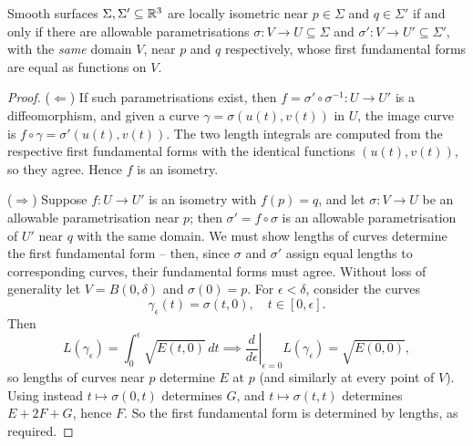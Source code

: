 \documentclass[a4paper]{scrartcl}
\begin{document}
\begin{lemma}\label{lem:fffisometry}
    Smooth surfaces $\Sigma, \Sigma' \subseteq \mathbb{R}^3$ are locally isometric near $p \in \Sigma$ and $q \in \Sigma'$ if and only if there are allowable parametrisations $\sigma: V \rightarrow U \subseteq \Sigma$ and $\sigma': V \rightarrow U' \subseteq \Sigma'$, with the \emph{same} domain $V$, near $p$ and $q$ respectively, whose first fundamental forms are equal as functions on $V$.
\end{lemma}
\begin{proof}
    ($\Leftarrow$) If such parametrisations exist, then $f = \sigma' \circ \sigma^{-1}: U \rightarrow U'$ is a diffeomorphism, and given a curve $\gamma = \sigma(u(t), v(t))$ in $U$, the image curve is $f \circ \gamma = \sigma'(u(t), v(t))$. The two length integrals are computed from the respective first fundamental forms with the identical functions $(u(t), v(t))$, so they agree. Hence $f$ is an isometry.

    ($\Rightarrow$) Suppose $f: U \rightarrow U'$ is an isometry with $f(p) = q$, and let $\sigma: V \rightarrow U$ be an allowable parametrisation near $p$; then $\sigma' = f \circ \sigma$ is an allowable parametrisation of $U'$ near $q$ with the same domain. We must show lengths of curves determine the first fundamental form -- then, since $\sigma$ and $\sigma'$ assign equal lengths to corresponding curves, their fundamental forms must agree. Without loss of generality let $V = B(0, \delta)$ and $\sigma(0) = p$. For $\epsilon < \delta$, consider the curves
    $$
    \gamma_\epsilon(t) = \sigma(t, 0), \quad t \in [0, \epsilon].
    $$
    Then
    $$
    L(\gamma_\epsilon) = \int_0^\epsilon \sqrt{E(t, 0)} \, dt \implies \left.\frac{d}{d\epsilon}\right|_{\epsilon = 0} L(\gamma_\epsilon) = \sqrt{E(0,0)},
    $$
    so lengths of curves near $p$ determine $E$ at $p$ (and similarly at every point of $V$). Using instead $t \mapsto \sigma(0, t)$ determines $G$, and $t \mapsto \sigma(t, t)$ determines $E + 2F + G$, hence $F$. So the first fundamental form is determined by lengths, as required.
\end{proof}
\end{document}

